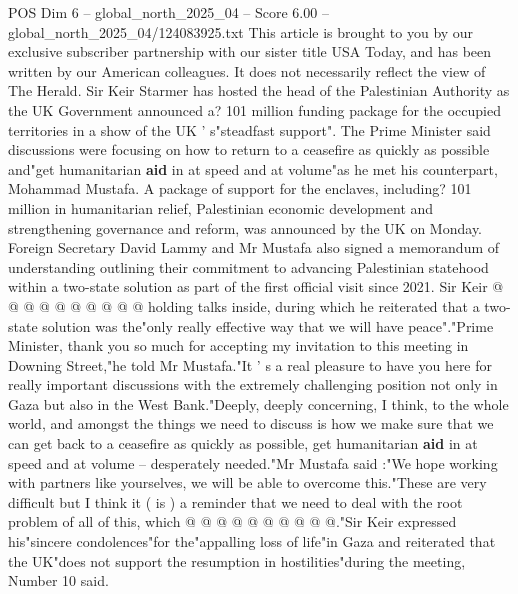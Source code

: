 \begin{textsample}{POS Dim 6 – global\_north\_2025\_04 – Score 6.00 – global\_north\_2025\_04/124083925.txt}  \label{ex:f6_pos_203}
This article is brought to you by our exclusive subscriber partnership with our sister title USA Today, and has been written by our American colleagues.
It does not necessarily reflect the view of The Herald.
Sir Keir Starmer has hosted the head of the Palestinian Authority as the UK Government announced a? 101 million funding package for the occupied territories in a show of the UK ' s"steadfast support".
The Prime Minister said discussions were focusing on how to return to a ceasefire as quickly as possible and"get humanitarian \textbf{aid} in at speed and at volume"as he met his counterpart, Mohammad Mustafa.
A package of support for the enclaves, including? 101 million in humanitarian relief, Palestinian economic development and strengthening governance and reform, was announced by the UK on Monday.
Foreign Secretary David Lammy and Mr Mustafa also signed a memorandum of understanding outlining their commitment to advancing Palestinian statehood within a two-state solution as part of the first official visit since 2021.
Sir Keir @ @ @ @ @ @ @ @ @ @ holding talks inside, during which he reiterated that a two-state solution was the"only really effective way that we will have peace"."Prime Minister, thank you so much for accepting my invitation to this meeting in Downing Street,"he told Mr Mustafa."It ' s a real pleasure to have you here for really important discussions with the extremely challenging position not only in Gaza but also in the West Bank."Deeply, deeply concerning, I think, to the whole world, and amongst the things we need to discuss is how we make sure that we can get back to a ceasefire as quickly as possible, get humanitarian \textbf{aid} in at speed and at volume -- desperately needed."Mr Mustafa said :"We hope working with partners like yourselves, we will be able to overcome this."These are very difficult but I think it ( is ) a reminder that we need to deal with the root problem of all of this, which @ @ @ @ @ @ @ @ @ @."Sir Keir expressed his"sincere condolences"for the"appalling loss of life"in Gaza and reiterated that the UK"does not support the resumption in hostilities"during the meeting, Number 10 said.

\end{textsample}
